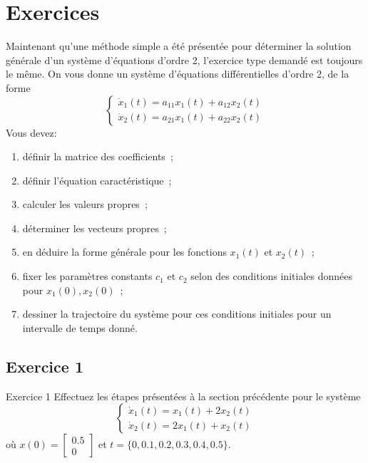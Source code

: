     \section{Exercices}
        Maintenant qu'une méthode simple a été présentée pour déterminer la solution générale d'un système  d'équations d'ordre 2, l'exercice type demandé est toujours le même. On vous donne un système d'équations différentielles d'ordre 2, de la forme
        \begin{equation}
            \begin{cases}
                \dot{x}_1(t)=a_{11} x_1(t) + a_{12} x_2(t)\\
                \dot{x}_2(t)=a_{21} x_1(t) + a_{22} x_2(t)
            \end{cases}
        \end{equation}
        Vous devez:
        \begin{enumerate}
            \item définir la matrice des coefficients~;
            \item définir l'équation caractéristique~;
            \item calculer les valeurs propres~;
            \item déterminer les vecteurs propres~;
            \item en déduire la forme générale pour les fonctions $x_1(t)$ et $x_2(t)$~;
            \item fixer les paramètres constants $c_1$ et $c_2$ selon des conditions initiales données pour $x_1(0), x_2(0)$~;
            \item dessiner la trajectoire du système pour ces conditions initiales pour un intervalle de temps donné.
        \end{enumerate}
        \subsection{Exercice 1}
            \begin{exercise}{Exercice 1}
                Effectuez les étapes présentées à la section précédente pour le système
                \begin{equation}
                    \begin{cases}
                        \dot{x}_1(t)=x_1(t) + 2 x_2(t)\\
                        \dot{x}_2(t)=2 x_1(t) + x_2(t)
                    \end{cases}
                \end{equation}
                où $x(0)=\begin{bmatrix} 0.5 \\ 0 \end{bmatrix}$ et $t=\{0, 0.1, 0.2, 0.3, 0.4, 0.5\}$.
            \end{exercise}

